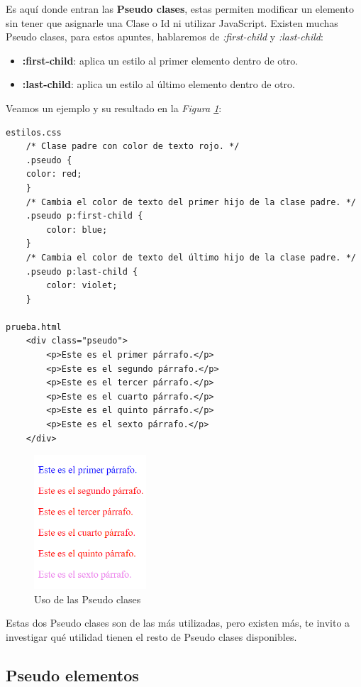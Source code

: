 Es aquí donde entran las \textbf{Pseudo clases}, estas permiten modificar un elemento sin tener que asignarle una Clase o Id ni utilizar JavaScript. Existen muchas Pseudo clases, para estos apuntes, hablaremos de \textit{:first-child} y \textit{:last-child}:
\begin{itemize}
    \item \textbf{:first-child}: aplica un estilo al primer elemento dentro de otro.
    \item \textbf{:last-child}: aplica un estilo al último elemento dentro de otro.
\end{itemize}

Veamos un ejemplo y su resultado en la \textit{Figura \ref{fig: 38}}:
\begin{lstlisting}
estilos.css
    /* Clase padre con color de texto rojo. */
    .pseudo {
    color: red;
    }
    /* Cambia el color de texto del primer hijo de la clase padre. */
    .pseudo p:first-child {
        color: blue;
    }
    /* Cambia el color de texto del último hijo de la clase padre. */
    .pseudo p:last-child {
        color: violet;
    }

prueba.html
    <div class="pseudo">
        <p>Este es el primer párrafo.</p>
        <p>Este es el segundo párrafo.</p>
        <p>Este es el tercer párrafo.</p>
        <p>Este es el cuarto párrafo.</p>
        <p>Este es el quinto párrafo.</p>
        <p>Este es el sexto párrafo.</p>
    </div>
\end{lstlisting}
\begin{figure}[H]
    \centering
    \caption{Uso de las Pseudo clases}
    \label{fig: 38}
    \includegraphics[height=5cm]{ss/pseudo-clases.png}
\end{figure}

Estas dos Pseudo clases son de las más utilizadas, pero existen más, te invito a investigar qué utilidad tienen el resto de Pseudo clases disponibles.


\subsection{Pseudo elementos}

